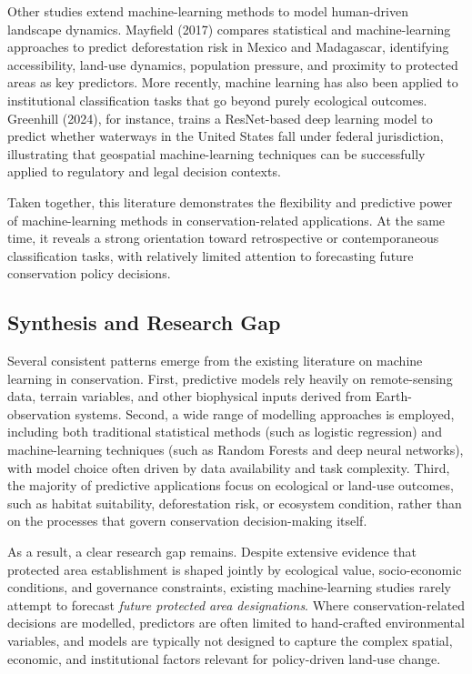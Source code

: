 \documentclass[12pt]{article}
\theoremstyle{break} %
\begin{document}
Other studies extend machine-learning methods to model human-driven landscape dynamics. Mayfield (2017) compares statistical and machine-learning approaches to predict deforestation risk in Mexico and Madagascar, identifying accessibility, land-use dynamics, population pressure, and proximity to protected areas as key predictors. More recently, machine learning has also been applied to institutional classification tasks that go beyond purely ecological outcomes. Greenhill (2024), for instance, trains a ResNet-based deep learning model to predict whether waterways in the United States fall under federal jurisdiction, illustrating that geospatial machine-learning techniques can be successfully applied to regulatory and legal decision contexts.

Taken together, this literature demonstrates the flexibility and predictive power of machine-learning methods in conservation-related applications. At the same time, it reveals a strong orientation toward retrospective or contemporaneous classification tasks, with relatively limited attention to forecasting future conservation policy decisions.

\subsection{Synthesis and Research Gap} \label{synthesis-gap}

Several consistent patterns emerge from the existing literature on machine learning in conservation. First, predictive models rely heavily on remote-sensing data, terrain variables, and other biophysical inputs derived from Earth-observation systems. Second, a wide range of modelling approaches is employed, including both traditional statistical methods (such as logistic regression) and machine-learning techniques (such as Random Forests and deep neural networks), with model choice often driven by data availability and task complexity. Third, the majority of predictive applications focus on ecological or land-use outcomes, such as habitat suitability, deforestation risk, or ecosystem condition, rather than on the processes that govern conservation decision-making itself.

As a result, a clear research gap remains. Despite extensive evidence that protected area establishment is shaped jointly by ecological value, socio-economic conditions, and governance constraints, existing machine-learning studies rarely attempt to forecast \textit{future protected area designations}. Where conservation-related decisions are modelled, predictors are often limited to hand-crafted environmental variables, and models are typically not designed to capture the complex spatial, economic, and institutional factors relevant for policy-driven land-use change.
\end{document}
